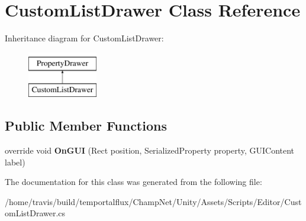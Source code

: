 \hypertarget{class_custom_list_drawer}{\section{Custom\-List\-Drawer Class Reference}
\label{class_custom_list_drawer}
}
Inheritance diagram for Custom\-List\-Drawer\-:\begin{figure}[H]
\begin{center}
\leavevmode
\includegraphics[height=2.000000cm]{class_custom_list_drawer}
\end{center}
\end{figure}
\subsection*{Public Member Functions}
\begin{DoxyCompactItemize}
\item 
\hypertarget{class_custom_list_drawer_adee7866de612fda009e51fe0905bd85d}{override void {\bfseries On\-G\-U\-I} (Rect position, Serialized\-Property property, G\-U\-I\-Content label)}\label{class_custom_list_drawer_adee7866de612fda009e51fe0905bd85d}

\end{DoxyCompactItemize}


The documentation for this class was generated from the following file\-:\begin{DoxyCompactItemize}
\item 
/home/travis/build/temportalflux/\-Champ\-Net/\-Unity/\-Assets/\-Scripts/\-Editor/Custom\-List\-Drawer.\-cs\end{DoxyCompactItemize}

